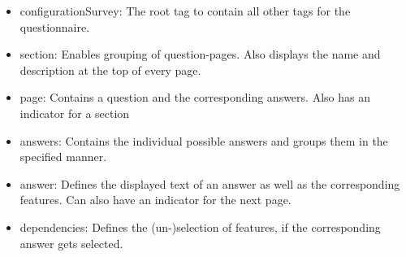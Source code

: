 \begin{itemize}
\item configurationSurvey: The root tag to contain all other tags for the questionnaire.
\item section: Enables grouping of question-pages. Also displays the name and description at the top of every page.
\item page: Contains a question and the corresponding answers. Also has an indicator for a section
\item answers: Contains the individual possible answers and groups them in the specified manner.
\item answer: Defines the displayed text of an answer as well as the corresponding features. Can also have an indicator for the next page.
\item dependencies: Defines the (un-)selection of features, if the corresponding answer gets selected.
\end{itemize}